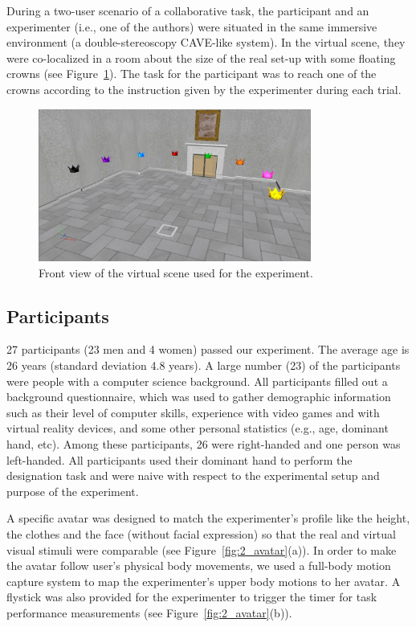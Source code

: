 During a two-user scenario of a collaborative task, the participant and an experimenter (i.e., one of the authors) were situated in the same immersive environment (a double-stereoscopy CAVE-like system). In the virtual scene, they were co-localized in a room about the size of the real set-up with some floating crowns (see Figure~\ref{fig:2_virtual_room}). The task for the participant was to reach one of the crowns according to the instruction given by the experimenter during each trial.

\begin{figure}[tb]
  \centering
  \includegraphics[width=0.8\textwidth]{figures/2_virtual_room}
  \caption{\label{fig:2_virtual_room}Front view of the virtual scene used for the experiment.}
\end{figure}

\subsection{Participants}
27 participants (23 men and 4 women) passed our experiment. The average age is 26 years (standard deviation 4.8 years).
A large number (23) of the participants were people with a computer science background. All participants filled out a background questionnaire, which was used to gather demographic information such as their level of computer skills, experience with video games and with virtual reality devices, and some other personal statistics (e.g., age, dominant hand, etc). Among these participants, 26 were right-handed and one person was left-handed. All participants used their dominant hand to perform the designation task and were naive with respect to the experimental setup and purpose of the experiment.

A specific avatar was designed to match the experimenter's profile like the height, the clothes and the face (without facial expression) so that the real and virtual visual stimuli were comparable (see Figure~\ref{fig:2_avatar}(a)). In order to make the avatar follow user's physical body movements, we used a full-body motion capture system to map the experimenter's upper body motions to her avatar. A flystick was also provided for the experimenter to trigger the timer for task performance measurements (see Figure~\ref{fig:2_avatar}(b)).

